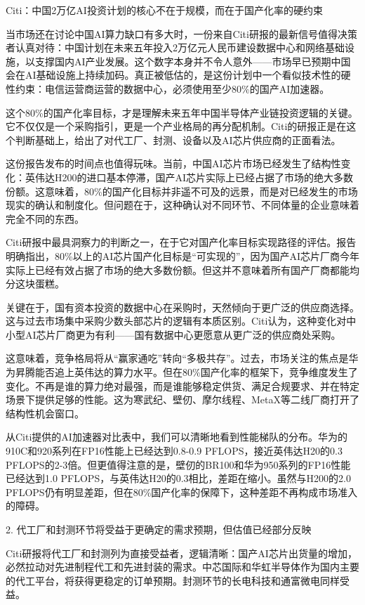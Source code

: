 \documentclass[11pt]{ctexart}
\begin{document}
Citi：中国2万亿AI投资计划的核心不在于规模，而在于国产化率的硬约束

当市场还在讨论中国AI算力缺口有多大时，一份来自Citi研报的最新信号值得决策者认真对待：中国计划在未来五年投入2万亿元人民币建设数据中心和网络基础设施，以支撑国内AI产业发展。这个数字本身并不令人意外——市场早已预期中国会在AI基础设施上持续加码。真正被低估的，是这份计划中一个看似技术性的硬性约束：电信运营商运营的数据中心，必须使用至少80\%的国产AI加速器。

这个80\%的国产化率目标，才是理解未来五年中国半导体产业链投资逻辑的关键。它不仅仅是一个采购指引，更是一个产业格局的再分配机制。Citi的研报正是在这个判断基础上，给出了对代工厂、封测、设备以及AI芯片供应商的正面看法。

这份报告发布的时间点也值得玩味。当前，中国AI芯片市场已经发生了结构性变化：英伟达H200的进口基本停滞，国产AI芯片实际上已经占据了市场的绝大多数份额。这意味着，80\%的国产化目标并非遥不可及的远景，而是对已经发生的市场现实的确认和制度化。但问题在于，这种确认对不同环节、不同体量的企业意味着完全不同的东西。

Citi研报中最具洞察力的判断之一，在于它对国产化率目标实现路径的评估。报告明确指出，80\%以上的AI芯片国产化目标是“可实现的”，因为国产AI芯片厂商今年实际上已经有效占据了市场的绝大多数份额。但这并不意味着所有国产厂商都能均分这块蛋糕。

关键在于，国有资本投资的数据中心在采购时，天然倾向于更广泛的供应商选择。这与过去市场集中采购少数头部芯片的逻辑有本质区别。Citi认为，这种变化对中小型AI芯片厂商更为有利——国有数据中心更愿意从更广泛的供应商处采购。

这意味着，竞争格局将从“赢家通吃”转向“多极共存”。过去，市场关注的焦点是华为昇腾能否追上英伟达的算力水平。但在80\%国产化率的框架下，竞争维度发生了变化。不再是谁的算力绝对最强，而是谁能够稳定供货、满足合规要求、并在特定场景下提供足够的性能。这为寒武纪、壁仞、摩尔线程、MetaX等二线厂商打开了结构性机会窗口。

从Citi提供的AI加速器对比表中，我们可以清晰地看到性能梯队的分布。华为的910C和920系列在FP16性能上已经达到0.8-0.9 PFLOPS，接近英伟达H20的0.3 PFLOPS的2-3倍。但更值得注意的是，壁仞的BR100和华为950系列的FP16性能已经达到1.0 PFLOPS，与英伟达H20的0.3相比，差距在缩小。虽然与H200的2.0 PFLOPS仍有明显差距，但在80\%国产化率的保障下，这种差距不再构成市场准入的障碍。

2. 代工厂和封测环节将受益于更确定的需求预期，但估值已经部分反映

Citi研报将代工厂和封测列为直接受益者，逻辑清晰：国产AI芯片出货量的增加，必然拉动对先进制程代工和先进封装的需求。中芯国际和华虹半导体作为国内主要的代工平台，将获得更稳定的订单预期。封测环节的长电科技和通富微电同样受益。
\end{document}
